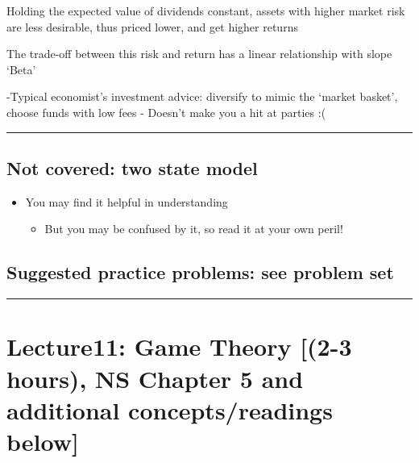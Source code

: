 \documentclass[]{article}
\providecommand{\tightlist}{%
  \setlength{\itemsep}{0pt}\setlength{\parskip}{0pt}}
\begin{document}
\bigskip

Holding the expected value of dividends constant, assets with higher market risk are less desirable, thus priced lower, and get higher returns

The trade-off between this risk and return has a linear relationship with slope `Beta'

\bigskip

-Typical economist's investment advice: diversify to mimic the `market basket', choose funds with low fees
- Doesn't make you a hit at parties :(

\begin{center}\rule{0.5\linewidth}{\linethickness}\end{center}

\hypertarget{not-covered-two-state-model}{%
\subsection{Not covered: two state model}\label{not-covered-two-state-model}}

\begin{itemize}
\tightlist
\item
  You may find it helpful in understanding

  \begin{itemize}
  \tightlist
  \item
    But you may be confused by it, so read it at your own peril!
  \end{itemize}
\end{itemize}

\hypertarget{suggested-practice-problems-see-problem-set}{%
\subsection{Suggested practice problems: see problem set}\label{suggested-practice-problems-see-problem-set}}

\begin{center}\rule{0.5\linewidth}{\linethickness}\end{center}

\hypertarget{lecture11-game-theory-2-3-hours-ns-chapter-5-and-additional-conceptsreadings-below}{%
\section{Lecture11: Game Theory {[}(2-3 hours), NS Chapter 5 and additional concepts/readings below{]}}\label{lecture11-game-theory-2-3-hours-ns-chapter-5-and-additional-conceptsreadings-below}}
\end{document}

